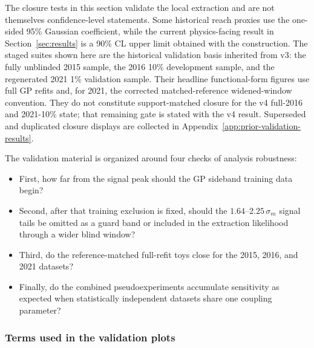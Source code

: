 The closure tests in this section validate the local extraction and are not themselves
confidence-level statements. Some historical reach proxies use the one-sided 95\%
Gaussian coefficient, while the current physics-facing result in
Section~\ref{sec:results} is a 90\% CL upper limit obtained with the \CLs{} construction.
The staged suites shown here are the historical validation basis inherited from v3:
the fully unblinded 2015 sample, the 2016 10\% development sample, and the regenerated
2021 1\% validation sample. Their headline functional-form figures use full GP refits
and, for 2021, the corrected matched-reference widened-window convention. They do not
constitute support-matched closure for the v4 full-2016 and 2021-10\% state; that
remaining gate is stated with the v4 result. Superseded and duplicated closure
displays are collected in Appendix~\ref{app:prior-validation-results}.

The validation material is organized around four checks of analysis robustness:

\begin{itemize}
    \item First, how far from the signal peak should the GP sideband training data begin?

    \item  Second, after that training exclusion is fixed, should the $1.64$--$2.25\,\sigma_m$ signal tails be omitted as a guard band or included in the extraction likelihood through a wider blind window?

    \item Third, do the reference-matched full-refit toys close for the 2015, 2016, and 2021 datasets?

    \item   Finally, do the combined pseudoexperiments accumulate sensitivity as expected when statistically independent datasets share one coupling parameter?

\end{itemize}



\subsubsection*{Terms used in the validation plots}

